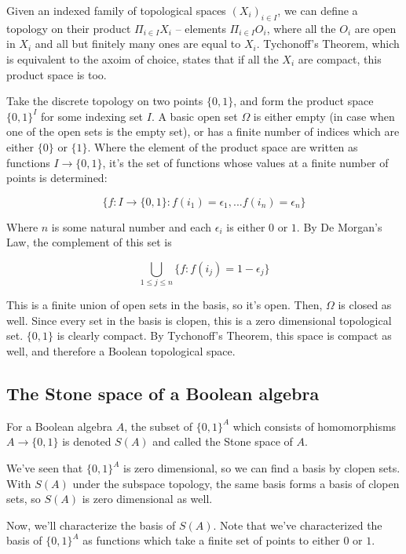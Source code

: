 \documentclass{article}
\begin{document}
        Given an indexed family of topological spaces $(X_i)_{i \in I}$, we can
        define a topology on their product $\Pi_{i \in I} X_i$ -- elements
        $\Pi_{i \in I} O_i$, where all the $O_i$ are open in $X_i$ and all but
        finitely many ones are equal to $X_i$. Tychonoff's Theorem, which is
        equivalent to the axoim of choice, states that if all the $X_i$ are
        compact, this product space is too.

        Take the discrete topology on two points $\{0,1\}$,
        and form the product space $\{0,1\}^I$ for some indexing set $I$. A
        basic open set $\Omega$ is either empty (in case when one of the open
        sets is the empty set), or has a finite number of indices which are
        either $\{0\}$ or $\{1\}$. Where the element  of the product space are
        written as functions $I \rightarrow \{0,1\}$, it's the set of
        functions whose values at a finite number of points is determined:

        \[\{f: I \rightarrow \{0,1\}: f(i_1) = \epsilon_1, ... f(i_n) =
        \epsilon_n\}\]

        Where $n$ is some natural number and each $\epsilon_i$ is either $0$ or
        $1$. By De Morgan's Law, the complement of this set is

        \[\bigcup_{1 \leq j \leq n} \{f : f(i_j) = 1 - \epsilon_j\}\]

        This is a finite union of open sets in the basis, so it's open. Then,
        $\Omega$ is closed as well. Since every set in the basis is clopen, this
        is a zero dimensional topological set. $\{0,1\}$ is clearly compact. By
        Tychonoff's Theorem, this space is compact as well, and therefore a
        Boolean topological space.

    \subsection{The Stone space of a Boolean algebra}

      For a Boolean algebra $A$, the subset of $\{0,1\}^A$ which consists of
      homomorphisms $A \rightarrow \{0,1\}$ is denoted $S(A)$ and called the
      Stone space of $A$.

      We've seen that $\{0,1\}^A$ is zero dimensional, so we can find a basis by
      clopen sets. With $S(A)$ under the subspace topology, the same basis forms
      a basis of clopen sets, so $S(A)$ is zero dimensional as well.

      Now, we'll characterize the basis of $S(A)$. Note that we've characterized
      the basis of $\{0,1\}^A$ as functions which take a finite set of points to
      either $0$ or $1$.
\end{document}
